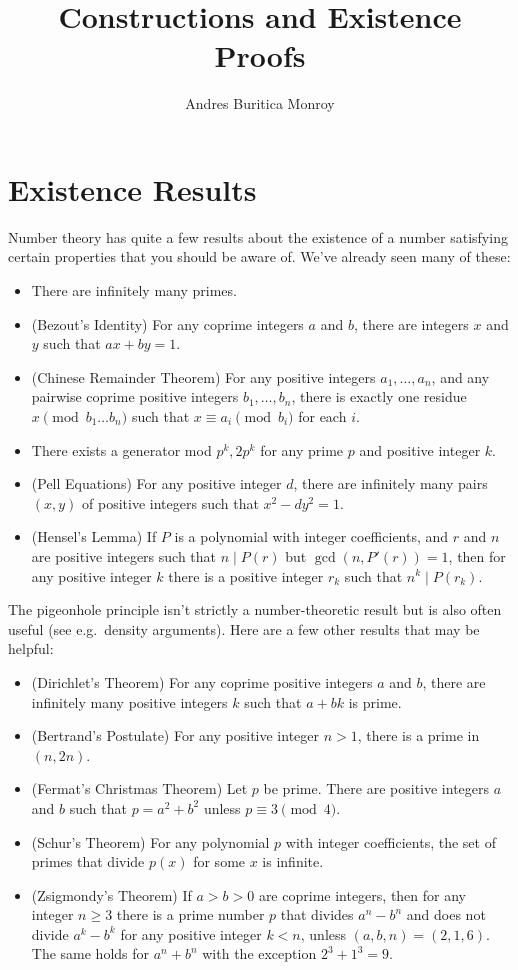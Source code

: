 \documentclass{article}
\title{Constructions and Existence Proofs}
\author{Andres Buritica Monroy}
\date{}
\begin{document}
\maketitle
\section{Existence Results}
Number theory has quite a few results about the existence of a number satisfying
certain properties that you should be aware of. We've already seen many of
these:
\begin{itemize}
	\item There are infinitely many primes.
	\item (Bezout's Identity)
	      For any coprime integers $a$ and $b$, there are integers $x$ and $y$ such
	      that $ax+by=1$.
	\item (Chinese Remainder Theorem)
	      For any positive integers $a_1,\ldots,a_n$, and any pairwise coprime positive
	      integers $b_1,\ldots,b_n$, there is exactly one residue $x\pmod {b_1\ldots
			      b_n}$ such that $x\equiv a_i\pmod{b_i}$ for each $i$.
	\item There exists a generator mod $p^k,2p^k$ for any prime $p$ and positive
	      integer $k$.
	\item (Pell Equations) For any positive integer $d$, there are infinitely many
	      pairs $(x,y)$ of positive integers such that $x^2-dy^2=1$.
	\item (Hensel's Lemma) If $P$ is a polynomial with integer coefficients, and
	      $r$ and $n$ are positive integers such that $n\mid P(r)$ but
	      $\gcd(n,P'(r))=1$, then for any positive integer $k$ there is a positive
	      integer $r_k$ such that $n^k\mid P(r_k)$.
\end{itemize}
The pigeonhole principle isn't strictly a number-theoretic result but is also
often useful (see e.g.\ density arguments).
Here are a few other results that may be helpful:
\begin{itemize}
	\item (Dirichlet's Theorem)
	      For any coprime positive integers $a$ and $b$, there are infinitely many
	      positive integers $k$ such that $a+bk$ is prime.
	\item (Bertrand's Postulate)
	      For any positive integer $n>1$, there is a prime in $(n,2n)$.
	\item (Fermat's Christmas Theorem) Let $p$ be prime. There are positive
	      integers $a$ and $b$ such that $p=a^2+b^2$ unless $p\equiv 3\pmod 4$.
	\item (Schur's Theorem) For any polynomial $p$ with integer coefficients, the
	      set of primes that divide $p(x)$ for some $x$ is infinite.
	\item (Zsigmondy's Theorem) If $a>b>0$ are coprime integers, then for any
	      integer $n\ge 3$ there is a prime number $p$ that divides $a^n-b^n$ and does
	      not divide $a^k-b^k$ for any positive integer $k<n$, unless
	      $(a,b,n)=(2,1,6)$. The same holds for $a^n+b^n$ with the exception
	      $2^3+1^3=9$.
\end{itemize}
\end{document}
